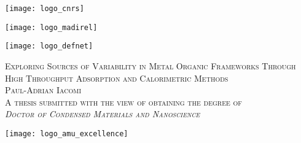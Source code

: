 \begin{titlepage}

\vspace*{-2cm}
\begin{center}
	\begin{minipage}[c]{0.3\linewidth}
		\raggedright
		\texttt{[image: logo\_cnrs]}
	\end{minipage}\hfill
	\begin{minipage}[c]{0.3\linewidth}
		\centering
		\texttt{[image: logo\_madirel]}
	\end{minipage}\hfill
	\begin{minipage}[c]{0.3\linewidth}
		\raggedleft
		\texttt{[image: logo\_defnet]}
	\end{minipage}\hfill

	\vspace{1.5cm}

	\LARGE \scshape
	Exploring Sources of Variability in Metal Organic Frameworks 
	Through High Throughput Adsorption and Calorimetric Methods \\
	\vspace{1.5cm}
	\Large \upshape 
	Paul-Adrian Iacomi \\
	\vspace{1.8cm}
	\large \upshape
	A thesis submitted with the view of obtaining the degree of \\
	\textit{Doctor of Condensed Materials and Nanoscience}\\

	\vspace{1cm}
	\begin{minipage}[c]{\linewidth}
		\centering
		\texttt{[image: logo\_amu\_excellence]}
	\end{minipage}\hfill
	\vspace{1.6cm}

\end{center}


\end{titlepage}
